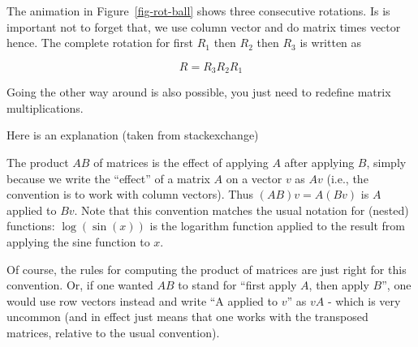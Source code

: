 \documentclass[
  letterpaper,
  DIV=11,
  numbers=noendperiod]{scrartcl}
\begin{document}
The animation in Figure~\ref{fig-rot-ball} shows three consecutive
rotations. Is is important not to forget that, we use column vector and
do matrix times vector hence. The complete rotation for first \(R_1\)
then \(R_2\) then \(R_3\) is written as

\begin{tcolorbox}[enhanced jigsaw, opacitybacktitle=0.6, rightrule=.15mm, breakable, bottomtitle=1mm, arc=.35mm, colframe=quarto-callout-caution-color-frame, coltitle=black, leftrule=.75mm, title=\textcolor{quarto-callout-caution-color}{\faFire}\hspace{0.5em}{Danger}, left=2mm, toptitle=1mm, colbacktitle=quarto-callout-caution-color!10!white, titlerule=0mm, colback=white, bottomrule=.15mm, toprule=.15mm, opacityback=0]
\[
R = R_3 R_2 R_1
\]
\end{tcolorbox}

Going the other way around is also possible, you just need to redefine
matrix multiplications.

\begin{tcolorbox}[enhanced jigsaw, opacitybacktitle=0.6, rightrule=.15mm, breakable, bottomtitle=1mm, arc=.35mm, colframe=quarto-callout-caution-color-frame, coltitle=black, leftrule=.75mm, title=\textcolor{quarto-callout-caution-color}{\faFire}\hspace{0.5em}{More details on the order.}, left=2mm, toptitle=1mm, colbacktitle=quarto-callout-caution-color!10!white, titlerule=0mm, colback=white, bottomrule=.15mm, toprule=.15mm, opacityback=0]
Here is an explanation (taken from stackexchange)

The product \(AB\) of matrices is the effect of applying \(A\) after
applying \(B\), simply because we write the ``effect'' of a matrix \(A\)
on a vector \(v\) as \(Av\) (i.e., the convention is to work with column
vectors). Thus \((AB)v = A(Bv)\) is \(A\) applied to \(Bv\). Note that
this convention matches the usual notation for (nested) functions:
\(\log(\sin(x))\) is the logarithm function applied to the result from
applying the sine function to \(x\).

Of course, the rules for computing the product of matrices are just
right for this convention. Or, if one wanted \(AB\) to stand for ``first
apply \(A\), then apply \(B\)'', one would use row vectors instead and
write ``A applied to \(v\)'' as \(vA\) - which is very uncommon (and in
effect just means that one works with the transposed matrices, relative
to the usual convention).
\end{tcolorbox}
\end{document}
